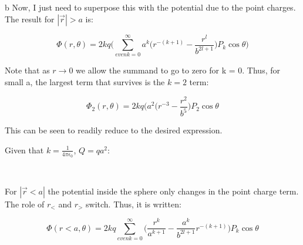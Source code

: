 \begin{homeworkProblem}[Jackson 3rd ed. : 3.7]
\begin{homeworkSection}{b}
Now, I just need to superpose this with the potential due to the point charges. The result for $|\vec{r}|>a$ is:

\[
\Phi(r,\theta) = 2kq \bigg( \sum\limits_{even k=0}^\infty a^k \Big(r^{-(k+1)}-\frac{r^l}{b^{2l+1}}\Big) P_k\cos\theta \bigg)
\]

Note that as $r \rightarrow 0$ we allow the summand to go to zero for k = 0. Thus, for small a, the largest term that survives is the $k=2$ term:

\[
\Phi_2(r,\theta) = 2kq\bigg( a^2(r^{-3} - \frac{r^2}{b^5} \bigg)P_2\cos\theta
\]

This can be seen to readily reduce to the desired expression. 

Given that $k = \frac{1}{4\pi\epsilon_0}$, $Q = qa^2$: \\ \par
\problemAnswer{
\[ \Phi_2(r,\theta) = \frac{Q}{2\pi\epsilon_0 r^3}\bigg(1 - \frac{r^5}{b^5} \bigg)P_2\cos\theta \]
}
\\ \par
For $|\vec{r}<a|$ the potential inside the sphere only changes in the point charge term. The role of $r_<$ and $r_>$ switch. Thus, it is written:

\[
\Phi(r<a,\theta) = 2kq \sum\limits_{even k = 0}^{\infty} \bigg( \frac{r^k}{a^{k+1}} - \frac{a^k}{b^{2l+1}}r^{-(k+1)}\bigg) P_k\cos\theta
\]
\end{homeworkSection}

\end{homeworkProblem}